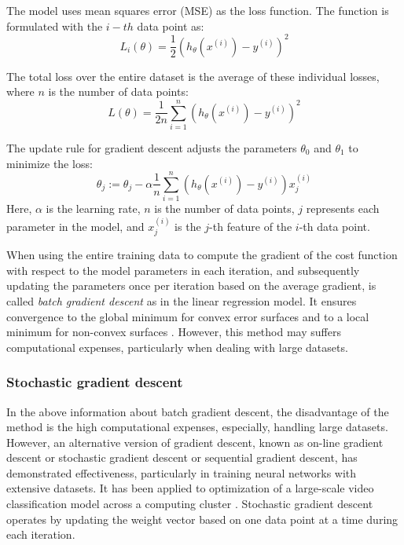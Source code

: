 \documentclass[12pt,a4paper]{article}
\begin{document}
The model uses mean squares error (MSE) as the loss function. The function is formulated with the $i-th$ data point as:
\begin{equation}
	L_i(\theta) = \frac{1}{2} \left(h_\theta(x^{(i)}) - y^{(i)}\right)^2
\end{equation}

The total loss over the entire dataset is the average of these individual losses, where $n$ is the number of data points:
\begin{equation}
	 L(\theta) = \frac{1}{2n} \sum_{i=1}^{n} \left(h_\theta(x^{(i)}) - y^{(i)}\right)^2
\end{equation}

The update rule for gradient descent adjusts the parameters $\theta_0$ and $\theta_1$ to minimize the loss:
\begin{equation}
	\theta_j := \theta_j - \alpha \frac{1}{n} \sum_{i=1}^{n} \left(h_\theta(x^{(i)}) - y^{(i)}\right) x_j^{(i)}
\end{equation}
Here, $\alpha$ is the learning rate, $n$ is the number of data points, $j$ represents each parameter in the model, and $x_j^{(i)}$ is the $j$-th feature of the $i$-th data point.



When using the entire training data to compute the gradient of the cost function with respect to the model parameters in each iteration, and subsequently updating the parameters once per iteration based on the average gradient, is called \textit{batch gradient descent} as in the linear regression model. It ensures convergence to the global minimum for convex error surfaces and to a local minimum for non-convex surfaces \cite{optimization}. However, this method may suffers computational expenses, particularly when dealing with large datasets. 


\subsubsection{Stochastic gradient descent}

In the above information about batch gradient descent, the disadvantage of the method is the high computational expenses, especially, handling large datasets. However, an alternative version of gradient descent, known as on-line gradient descent or stochastic gradient descent or sequential gradient descent, has demonstrated effectiveness, particularly in training neural networks with extensive datasets. It has been applied to optimization of a large-scale video classification model across a computing cluster \cite{videocls}. Stochastic gradient descent operates by updating the weight vector based on one data point at a time during each iteration.
\end{document}
